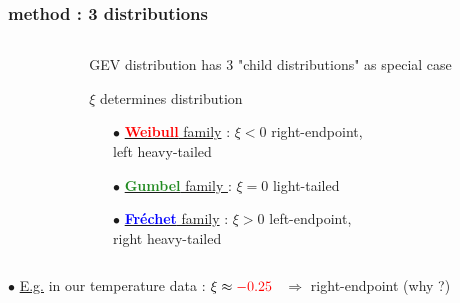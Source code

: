 \documentclass[9pt,xcolor={dvipsnames}]{beamer}
\begin{document}
\begin{frame}
	\frametitle{ method : 3 distributions }
	
\begin{columns}[c]
	\begin{column}{.7\textwidth}
	\centering
	\end{column}
	
   \begin{column}{.4\textwidth}

   		GEV distribution has 3 "child distributions" as special case
  \begin{block}{$\xi$ determines distribution }
\begin{itemize}
	\item[$\bullet$] \underline{\textcolor{red}{\textbf{Weibull}} family} : $\boxed{\xi<0}$ 
	right-endpoint, \\
	left heavy-tailed
	\item[$\bullet$] \underline{\textcolor{ForestGreen}{\textbf{Gumbel}} family }: $\boxed{\xi=0}$
	light-tailed
	\item[$\bullet$] \underline{\textcolor{blue}{\textbf{Fr\'echet}} family} : $\boxed{\xi>0}$
	left-endpoint,\\
	 right heavy-tailed
\end{itemize}
\end{block}
   \end{column}
\end{columns}
$\bullet$ \underline{E.g.} in our temperature data : $\xi\approx \textcolor{red}{-0.25}$ \ $\Rightarrow$ right-endpoint (why ?)
\end{frame}
\end{document}
